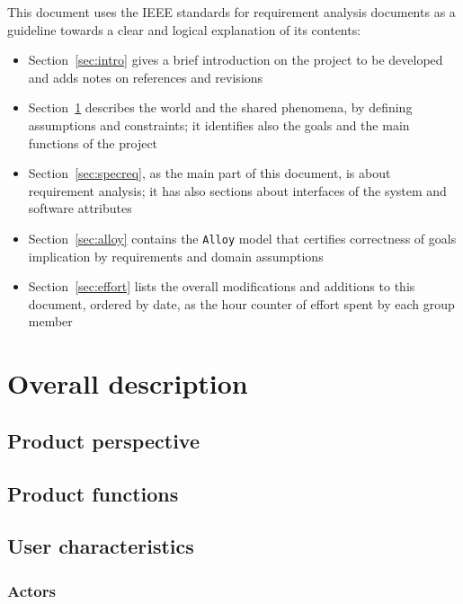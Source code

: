 \documentclass[12pt]{article}
\begin{document}
    This document uses the IEEE standards for requirement analysis documents as a guideline towards a clear and logical explanation of its contents:
    \begin{itemize}
      \item Section~\ref{sec:intro} gives a brief introduction on the project to be developed and adds notes on references and revisions
      \item Section~\ref{sec:overdesc} describes the world and the shared phenomena, by defining assumptions and constraints; it identifies also the goals and the main functions of the project
      \item Section~\ref{sec:specreq}, as the main part of this document, is about requirement analysis; it has also sections about interfaces of the system and software attributes
      \item Section~\ref{sec:alloy} contains the \texttt{Alloy} model that certifies correctness of goals implication by requirements and domain assumptions
      \item Section~\ref{sec:effort} lists the overall modifications and additions to this document, ordered by date, as the hour counter of effort spent by each group member
    \end{itemize}

\clearpage
\section{Overall description}
\label{sec:overdesc}

  \subsection{Product perspective}
  \subsection{Product functions}
  \subsection{User characteristics}

    \subsubsection{Actors}
\end{document}
